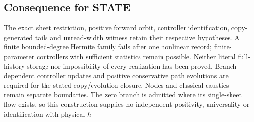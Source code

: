 \documentclass[11pt,a4paper]{article}
\begin{document}
\hypertarget{consequence-for-state}{%
\subsection{Consequence for STATE}\label{consequence-for-state}}

The exact sheet restriction, positive forward orbit, controller
identification, copy-generated tails and unread-width witness retain
their respective hypotheses. A finite bounded-degree Hermite family
fails after one nonlinear record; finite-parameter controllers with
sufficient statistics remain possible. Neither literal full-history
storage nor impossibility of every realization has been proved.
Branch-dependent controller updates and positive conservative path
evolutions are required for the stated copy/evolution closure. Nodes and
classical caustics remain separate boundaries. The zero branch is
admitted where its single-sheet flow exists, so this construction
supplies no independent positivity, universality or identification with
physical \(\hbar\).
\end{document}
